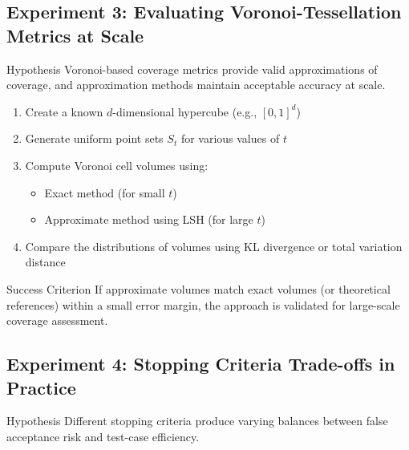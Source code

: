 \documentclass[11pt,a4paper]{article}
\begin{document}
\subsection{Experiment 3: Evaluating Voronoi-Tessellation Metrics at Scale}

\begin{theorembox}{Hypothesis}
Voronoi-based coverage metrics provide valid approximations of coverage, and approximation methods maintain acceptable accuracy at scale.
\end{theorembox}

\begin{tcolorbox}[
  colback=blue!5!white,
  colframe=blue!75!black,
  title=Experimental Design,
  fonttitle=\bfseries
]
\begin{enumerate}
\item Create a known $d$-dimensional hypercube (e.g., $[0,1]^d$)
\item Generate uniform point sets $S_t$ for various values of $t$
\item Compute Voronoi cell volumes using:
   \begin{itemize}
   \item Exact method (for small $t$)
   \item Approximate method using LSH (for large $t$)
   \end{itemize}
\item Compare the distributions of volumes using KL divergence or total variation distance
\end{enumerate}
\end{tcolorbox}

\begin{definitionbox}{Success Criterion}
If approximate volumes match exact volumes (or theoretical references) within a small error margin, the approach is validated for large-scale coverage assessment.
\end{definitionbox}

\subsection{Experiment 4: Stopping Criteria Trade-offs in Practice}

\begin{theorembox}{Hypothesis}
Different stopping criteria produce varying balances between false acceptance risk and test-case efficiency.
\end{theorembox}
\end{document}
